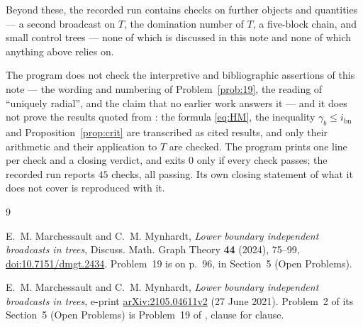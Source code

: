 \documentclass[11pt]{amsart}
\theoremstyle{definition}
\newcommand{\ibn}{i_{\mathrm{bn}}}
\newcommand{\gb}{\gamma_{b}}
\begin{document}
Beyond these, the recorded run contains checks on further objects and quantities
--- a second broadcast on $T$, the domination number of $T$, a five-block chain,
and small control trees --- none of which is discussed in this note and none of
which anything above relies on.

The program does not check the interpretive and bibliographic assertions of this
note --- the wording and numbering of Problem~\ref{prob:19}, the reading of
``uniquely radial'', and the claim that no earlier work answers it --- and it
does not prove the results quoted from \cite{MM2024}: the formula \eqref{eq:HM},
the inequality $\gb\le\ibn$ and Proposition~\ref{prop:crit} are transcribed as
cited results, and only their arithmetic and their application to $T$ are
checked. The program prints one line per check and a closing verdict, and exits
$0$ only if every check passes; the recorded run reports $45$ checks, all
passing. Its own closing statement of what it does not cover is reproduced with
it.

\begin{thebibliography}{9}

E.~M. Marchessault and C.~M. Mynhardt,
\emph{Lower boundary independent broadcasts in trees},
Discuss. Math. Graph Theory \textbf{44} (2024), 75--99,
\href{https://doi.org/10.7151/dmgt.2434}{doi:10.7151/dmgt.2434}.
Problem~19 is on p.~96, in Section~5 (Open Problems).

E.~M. Marchessault and C.~M. Mynhardt,
\emph{Lower boundary independent broadcasts in trees},
e-print \href{https://arxiv.org/abs/2105.04611v2}{arXiv:2105.04611v2}
(27 June 2021).
Problem~2 of its Section~5 (Open Problems) is Problem~19 of \cite{MM2024},
clause for clause.

\end{thebibliography}
\end{document}
